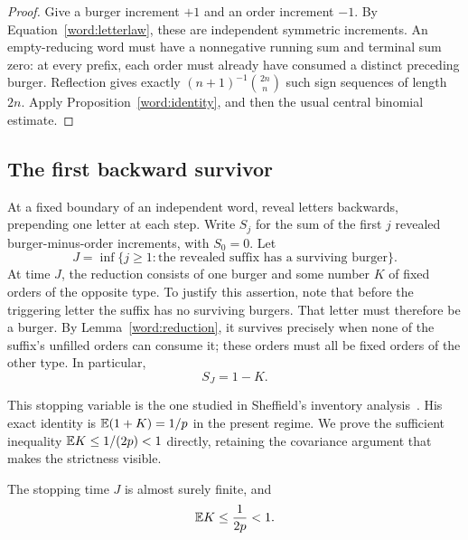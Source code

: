 \begin{proof}
Give a burger increment $+1$ and an order increment $-1$. By
Equation~\eqref{word:letterlaw}, these are independent symmetric
increments. An empty-reducing word must have a nonnegative running sum
and terminal sum zero: at every prefix, each order must already have
consumed a distinct preceding burger. Reflection gives exactly
$(n+1)^{-1}\binom{2n}{n}$ such sign sequences of length $2n$.
Apply Proposition~\ref{word:identity}, and then the usual central
binomial estimate.
\end{proof}

\subsection{The first backward survivor}

At a fixed boundary of an independent word, reveal letters backwards,
prepending one letter at each step. Write $S_j$ for the sum of the first
$j$ revealed burger-minus-order increments, with $S_0=0$. Let
\begin{equation}\label{word:J}
 J=\inf\{j\ge1:\text{the revealed suffix has a surviving burger}\}.
\end{equation}
At time $J$, the reduction consists of one burger and some number $K$
of fixed orders of the opposite type. To justify this assertion, note
that before the triggering letter the suffix has no surviving burgers.
That letter must therefore be a burger. By Lemma~\ref{word:reduction},
it survives precisely when none of the suffix's unfilled orders can
consume it; these orders must all be fixed orders of the other type.
In particular,
\begin{equation}\label{word:stopped-sum}
 S_J=1-K.
\end{equation}

This stopping variable is the one studied in Sheffield's inventory
analysis~\cite[Section~3.1]{Sheffield2016}.
His exact identity is $\mathbb E(1+K)=1/p$ in the present regime.
We prove the sufficient inequality $\mathbb E K\le1/(2p)<1$ directly,
retaining the covariance argument that makes the strictness visible.

\begin{proposition}\label{word:drift}
The stopping time $J$ is almost surely finite, and
\begin{equation}\label{word:drift-equation}
 \mathbb E K\le\frac{1}{2p}<1.
\end{equation}
\end{proposition}

